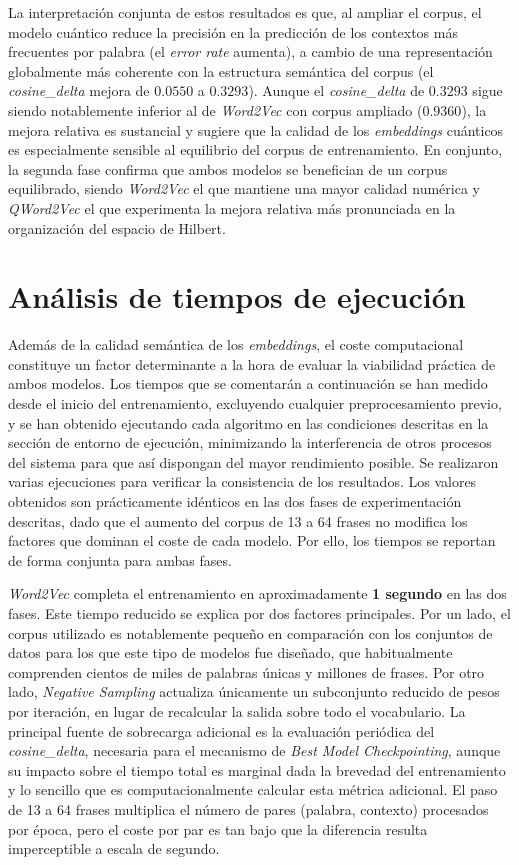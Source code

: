 La interpretación conjunta de estos resultados es que, al ampliar el corpus, el modelo cuántico reduce la precisión en la predicción de los contextos más frecuentes por palabra (el \textit{error rate} aumenta), a cambio de una representación globalmente más coherente con la estructura semántica del corpus (el \textit{cosine\_delta} mejora de $0.0550$ a $0.3293$). Aunque el \textit{cosine\_delta} de $0.3293$ sigue siendo notablemente inferior al de \textit{Word2Vec} con corpus ampliado ($0.9360$), la mejora relativa es sustancial y sugiere que la calidad de los \textit{embeddings} cuánticos es especialmente sensible al equilibrio del corpus de entrenamiento. En conjunto, la segunda fase confirma que ambos modelos se benefician de un corpus equilibrado, siendo \textit{Word2Vec} el que mantiene una mayor calidad numérica y \textit{QWord2Vec} el que experimenta la mejora relativa más pronunciada en la organización del espacio de Hilbert.


\section{Análisis de tiempos de ejecución}

Además de la calidad semántica de los \textit{embeddings}, el coste computacional constituye un factor determinante a la hora de evaluar la viabilidad práctica de ambos modelos. Los tiempos que se comentarán a continuación se han medido desde el inicio del entrenamiento, excluyendo cualquier preprocesamiento previo, y se han obtenido ejecutando cada algoritmo en las condiciones descritas en la sección de entorno de ejecución, minimizando la interferencia de otros procesos del sistema para que así dispongan del mayor rendimiento posible. Se realizaron varias ejecuciones para verificar la consistencia de los resultados. Los valores obtenidos son prácticamente idénticos en las dos fases de experimentación descritas, dado que el aumento del corpus de 13 a 64 frases no modifica los factores que dominan el coste de cada modelo. Por ello, los tiempos se reportan de forma conjunta para ambas fases.

\textit{Word2Vec} completa el entrenamiento en aproximadamente \textbf{1 segundo} en las dos fases. Este tiempo reducido se explica por dos factores principales. Por un lado, el corpus utilizado es notablemente pequeño en comparación con los conjuntos de datos para los que este tipo de modelos fue diseñado, que habitualmente comprenden cientos de miles de palabras únicas y millones de frases. Por otro lado, \textit{Negative Sampling} actualiza únicamente un subconjunto reducido de pesos por iteración, en lugar de recalcular la salida sobre todo el vocabulario. La principal fuente de sobrecarga adicional es la evaluación periódica del \textit{cosine\_delta}, necesaria para el mecanismo de \textit{Best Model Checkpointing}, aunque su impacto sobre el tiempo total es marginal dada la brevedad del entrenamiento y lo sencillo que es computacionalmente calcular esta métrica adicional. El paso de 13 a 64 frases multiplica el número de pares (palabra, contexto) procesados por época, pero el coste por par es tan bajo que la diferencia resulta imperceptible a escala de segundo.

